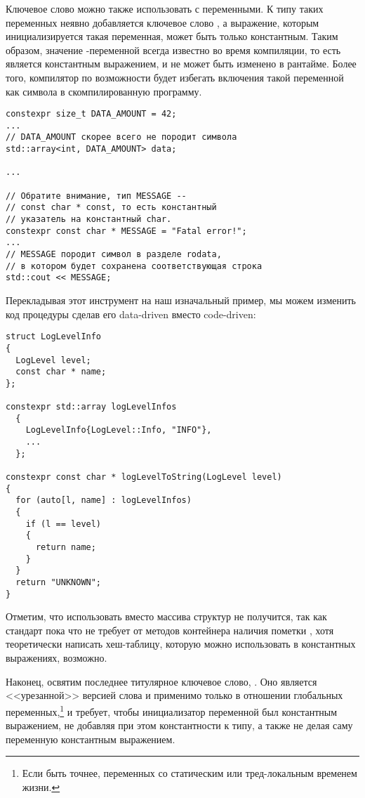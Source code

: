 Ключевое слово  можно также использовать с переменными.
К типу таких переменных неявно добавляется ключевое слово , а выражение, которым инициализируется такая переменная, может быть только константным.
Таким образом, значение -переменной всегда известно во время компиляции, то есть является константным выражением, и не может быть изменено в рантайме.
Более того, компилятор по возможности будет избегать включения такой переменной как символа в скомпилированную программу.
\begin{verbatim}
constexpr size_t DATA_AMOUNT = 42;
...
// DATA_AMOUNT скорее всего не породит символа
std::array<int, DATA_AMOUNT> data;

...

// Обратите внимание, тип MESSAGE --
// const char * const, то есть константный
// указатель на константный char.
constexpr const char * MESSAGE = "Fatal error!";
...
// MESSAGE породит символ в разделе rodata,
// в котором будет сохранена соответствующая строка
std::cout << MESSAGE;
\end{verbatim}
Перекладывая этот инструмент на наш изначальный пример, мы можем изменить код процедуры  сделав его data-driven вместо code-driven:
\begin{verbatim}
struct LogLevelInfo
{
  LogLevel level;
  const char * name;
};

constexpr std::array logLevelInfos
  {
    LogLevelInfo{LogLevel::Info, "INFO"},
    ...
  };

constexpr const char * logLevelToString(LogLevel level)
{
  for (auto[l, name] : logLevelInfos)
  {
    if (l == level)
    {
      return name;
    }
  }
  return "UNKNOWN";
}
\end{verbatim}
Отметим, что использовать  вместо массива структур не получится, так как стандарт пока что не требует от методов контейнера  наличия пометки , хотя теоретически написать хеш-таблицу, которую можно использовать в константных выражениях, возможно.

Наконец, освятим последнее титулярное ключевое слово, .
Оно является <<урезанной>> версией слова  и применимо только в отношении глобальных переменных,\footnote{Если быть точнее, переменных со статическим или тред-локальным временем жизни.} и требует, чтобы инициализатор переменной был константным выражением, не добавляя при этом константности к типу, а также не делая саму переменную константным выражением.

